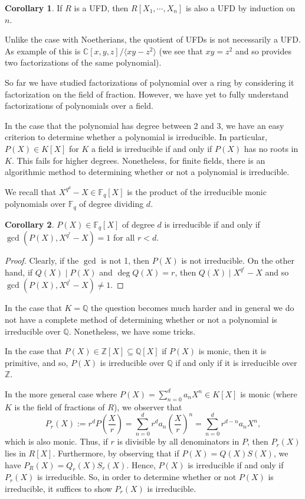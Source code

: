 \documentclass[]{article}
\theoremstyle{definition}
\newtheorem{corollary}{Corollary}[theorem]
\theoremstyle{definition}
\begin{document}
\begin{corollary}
  If \(R\) is a UFD, then \(R[X_1, \cdots, X_n]\) is also a UFD by induction on 
  \(n\).
\end{corollary}

Unlike the case with Noetherians, the quotient of UFDs is not necessarily a UFD.
As example of this is \(\mathbb{C}[x, y, z] /\langle xy - z^2 \rangle\) 
(we see that \(xy = z^2\) and so provides two factorizations of the same 
polynomial).

So far we have studied factorizations of polynomial over a ring by considering 
it factorization on the field of fraction. However, we have yet to fully understand 
factorizations of polynomials over a field. 

In the case that the polynomial has degree between 2 and 3, we have an easy 
criterion to determine whether a polynomial is irreducible. In particular, 
\(P(X) \in K[X]\) for \(K\) a field is irreducible if and only if \(P(X)\) has 
no roots in \(K\). This fails for higher degrees. Nonetheless, for finite fields, 
there is an algorithmic method to determining whether or not a polynomial is 
irreducible.

We recall that \(X^{q^d} - X \in \mathbb{F}_q[X]\) is the product of the 
irreducible monic polynomials over \(\mathbb{F}_q\) of degree dividing \(d\). 

\begin{corollary}
  \(P(X) \in \mathbb{F}_q[X]\) of degree \(d\) is irreducible if and only if 
  \(\gcd(P(X), X^{q^r} - X) = 1\) for all \(r < d\).
\end{corollary}
\begin{proof}
  Clearly, if the \(\gcd\) is not 1, then \(P(X)\) is not irreducible. On the other 
  hand, if \(Q(X) \mid P(X)\) and \(\deg Q(X) = r\), then \(Q(X) \mid X^{q^r} - X\) 
  and so \(\gcd(P(X), X^{q^r} - X) \neq 1\).
\end{proof}

In the case that \(K = \mathbb{Q}\) the question becomes much harder and in general 
we do not have a complete method of determining whether or not a polynomial 
is irreducible over \(\mathbb{Q}\). Nonetheless, we have some tricks. 

In the case that \(P(X) \in \mathbb{Z}[X] \subseteq \mathbb{Q}[X]\) if \(P(X)\) is 
monic, then it is primitive, and so, \(P(X)\) is irreducible over \(\mathbb{Q}\) 
if and only if it is irreducible over \(\mathbb{Z}\).

In the more general case where \(P(X) = \sum_{n = 0}^d a_n X^n \in K[X]\) is monic
(where \(K\) is the field of fractions of \(R\)), we observer that 
\[P_r(X) := r^d P\left(\frac{X}{r}\right) = \sum_{n = 0}^d r^d a_n\left(\frac{X}{r}\right)^n 
  = \sum_{n = 0}^d r^{d - n} a_n X^n,\]
which is also monic. Thus, if \(r\) is divisible by all denominators in \(P\), then 
\(P_r(X)\) lies in \(R[X]\). Furthermore, by observing that if \(P(X) = Q(X)S(X)\), 
we have \(P_R(X) = Q_r(X)S_r(X)\). Hence, \(P(X)\) is irreducible if and only if \(P_r(X)\) 
is irreducible. So, in order to determine whether or not \(P(X)\) is irreducible, 
it suffices to show \(P_r(X)\) is irreducible.
\end{document}
